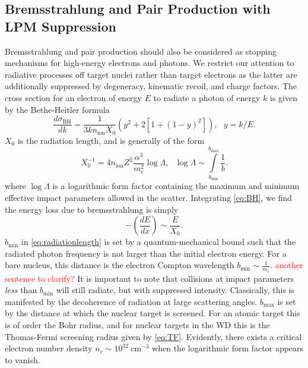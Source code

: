 \documentclass[twocolumn,showpacs,preprintnumbers,amsmath,amssymb,prd]{revtex4}
\newcommand{\OO}{\mathcal{O}}
\def\r{\right)}
\def\l{\left(}
\begin{document}
\begin{appendices}
\subsection{Bremsstrahlung and Pair Production with LPM Suppression}
Bremsstrahlung and pair production should also be considered as stopping mechanisms for high-energy electrons and photons. We restrict our attention to radiative processes off target nuclei rather than target electrons as the latter are additionally suppressed by degeneracy, kinematic recoil, and charge factors. 
The cross section for an electron of energy $E$ to radiate a photon of energy $k$ is given by the Bethe-Heitler formula
\begin{equation}
\label{eq:BH}
\frac{d \sigma_\text{BH}}{dk} = \frac{1}{3 k n_\text{ion} X_0} (y^2+2 [1+ (1-y)^2]), ~~~ y = k/E.
\end{equation}
$X_0$ is the radiation length, and is generally of the form
\begin{equation}
\label{eq:radiationlength}
X_0^{-1} = 4 n_\text{ion} Z^2 \frac{\alpha^3}{m_e^2} \log{\Lambda}, ~~~ \log{\Lambda} \sim \int \limits_{b_\text{min}}^{b_\text{max}} \frac{1}{b}.
\end{equation}
where $\log{\Lambda}$ is a logarithmic form factor containing the maximum and minimum effective impact parameters allowed in the scatter.
Integrating \eqref{eq:BH}, we find the energy loss due to bremsstrahlung is simply 
\begin{equation}
-\l\frac{dE}{dx}\r \sim \frac{E}{X_0}.
\end{equation}
$b_\text{min}$ in \eqref{eq:radiationlength} is set by a quantum-mechanical bound such that the radiated photon frequency is not larger than the initial electron energy. 
For a bare nucleus, this distance is the electron Compton wavelength $b_\text{min} \sim \frac{1}{m_e}$. \textcolor{red}{another sentence to clarify?}
It is important to note that collisions at impact parameters \emph{less} than $b_\text{min}$ will still radiate, but with suppressed intensity.
Classically, this is manifested by the decoherence of radiation at large scattering angles.
$b_\text{max}$ is set by the distance at which the nuclear target is screened.
For an atomic target this is of order the Bohr radius, and for nuclear targets in the WD this is the Thomas-Fermi screening radius given by \eqref{eq:TF}.
Evidently, there exists a critical electron number density $n_e \sim 10^{32} ~\text{cm}^{-3}$ when the logarithmic form factor appears to vanish. 


\end{appendices}
\end{document}
